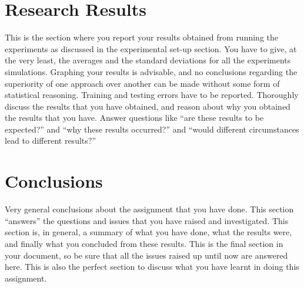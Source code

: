 \documentclass[conference]{IEEEtran}
\begin{document}
\section{Research Results}
This is the section where you report your results obtained from running the experiments as discussed in the experimental set-up section. You have to give, at the very least, the averages and the standard deviations for all the experiments simulations. Graphing your results is advisable, and no conclusions regarding the superiority of one approach over another can be made without some form of statistical reasoning. Training and testing errors have to be reported. Thoroughly discuss the results that you have obtained, and reason about why you obtained the results that you have. Answer questions like “are these results to be expected?” and “why these results occurred?” and “would different circumstances lead to different results?”

\section{Conclusions}
Very general conclusions about the assignment that you have done. This section “answers” the questions and issues that you have raised and investigated. This section is, in general, a summary of what you have done, what the results were, and finally what you concluded from these results. This is the final section in your document, so be sure that all the issues raised up until now are answered here. This is also the perfect section to discuss what you have learnt in doing this assignment.
\end{document}
